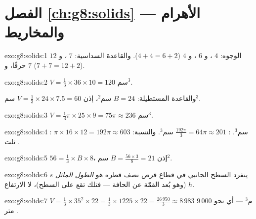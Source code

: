 \section*{الفصل \ref{ch:g8:solids} --- الأهرام والمخاريط}

\begin{solution}{exo:g8:solids:1}
 الوجوه: $4$ ، و $6$ ، و $4$ 
($4 + 4 = 6 + 2$). والقاعدة السداسية: $7$ ، و $12$ حرفًا، و $7$
 ($7 + 7 = 12 + 2$).
\end{solution}

\begin{solution}{exo:g8:solids:2}
$V = \frac13 \times 36 \times 10 = 120$ سم$^3$.

والقاعدة المستطيلة: $B = 24$ سم$^2$، إذن
$V = \frac13 \times 24 \times 7.5 = 60$ سم$^3$.
\end{solution}

\begin{solution}{exo:g8:solids:3}
$V = \frac13 \pi \times 25 \times 9 = 75\pi \approx 236$ سم$^3$.
\end{solution}

\begin{solution}{exo:g8:solids:4}
: $\pi \times 16 \times 12 = 192\pi \approx 603$ سم$^3$.
: $\frac{192\pi}{3} = 64\pi \approx 201$ سم$^3$. والنسبة: 
ثلث .
\end{solution}

\begin{solution}{exo:g8:solids:5}
$56 = \frac13 \times B \times 8$، إذن $B = \frac{56 \times 3}{8} = 21$
سم$^2$.
\end{solution}

\begin{solution}{exo:g8:solids:6}
ينفرد السطح الجانبي في قطاع قرص نصف قطره هو
\emph{الطول المائل} $s$ (وهو بُعد القمّة عن الحافة ---
فتلك  تقع على السطح)، لا الارتفاع $h$.
\end{solution}

\begin{solution}{exo:g8:solids:7}
$V = \frac13 \times 35^2 \times 22 = \frac13 \times 1225 \times 22
= \frac{26\,950}{3} \approx 8\,983$ م$^3$ --- أي نحو $9\,000$ متر
.
\end{solution}

